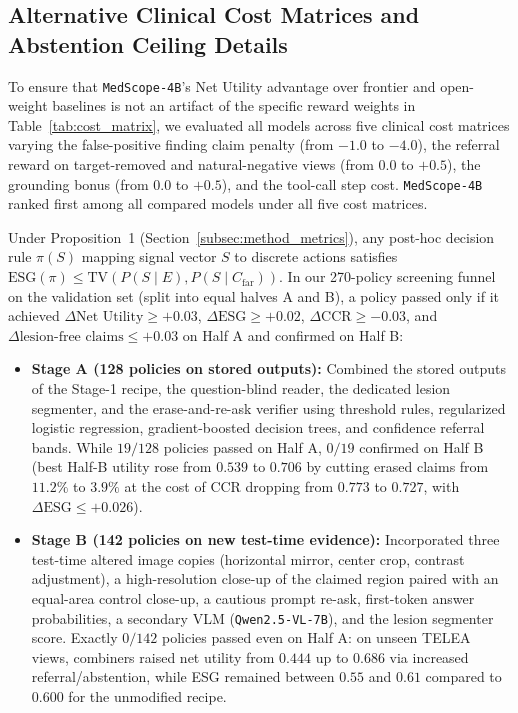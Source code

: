 \documentclass{article} %
\begin{document}
\subsection{Alternative Clinical Cost Matrices and Abstention Ceiling Details}
To ensure that \texttt{MedScope-4B}'s Net Utility advantage over frontier and open-weight baselines is not an artifact of the specific reward weights in Table~\ref{tab:cost_matrix}, we evaluated all models across five clinical cost matrices varying the false-positive finding claim penalty (from $-1.0$ to $-4.0$), the referral reward on target-removed and natural-negative views (from $0.0$ to $+0.5$), the grounding bonus (from $0.0$ to $+0.5$), and the tool-call step cost. \texttt{MedScope-4B} ranked first among all compared models under all five cost matrices.

Under Proposition~1 (Section~\ref{subsec:method_metrics}), any post-hoc decision rule $\pi(S)$ mapping signal vector $S$ to discrete actions satisfies $\text{ESG}(\pi) \le \text{TV}(P(S \mid E), P(S \mid C_{\text{far}}))$. In our 270-policy screening funnel on the validation set (split into equal halves A and B), a policy passed only if it achieved $\Delta\text{Net Utility} \ge +0.03$, $\Delta\text{ESG} \ge +0.02$, $\Delta\text{CCR} \ge -0.03$, and $\Delta\text{lesion-free claims} \le +0.03$ on Half A and confirmed on Half B:
\begin{itemize}[leftmargin=*,nosep]
    \item \textbf{Stage A (128 policies on stored outputs):} Combined the stored outputs of the Stage-1 recipe, the question-blind reader, the dedicated lesion segmenter, and the erase-and-re-ask verifier using threshold rules, regularized logistic regression, gradient-boosted decision trees, and confidence referral bands. While $19/128$ policies passed on Half A, $0/19$ confirmed on Half B (best Half-B utility rose from $0.539$ to $0.706$ by cutting erased claims from $11.2\%$ to $3.9\%$ at the cost of CCR dropping from $0.773$ to $0.727$, with $\Delta\text{ESG} \le +0.026$).
    \item \textbf{Stage B (142 policies on new test-time evidence):} Incorporated three test-time altered image copies (horizontal mirror, center crop, contrast adjustment), a high-resolution close-up of the claimed region paired with an equal-area control close-up, a cautious prompt re-ask, first-token answer probabilities, a secondary VLM (\texttt{Qwen2.5-VL-7B}), and the lesion segmenter score. Exactly $0/142$ policies passed even on Half A: on unseen TELEA views, combiners raised net utility from $0.444$ up to $0.686$ via increased referral/abstention, while ESG remained between $0.55$ and $0.61$ compared to $0.600$ for the unmodified recipe.
\end{itemize}
\end{document}
